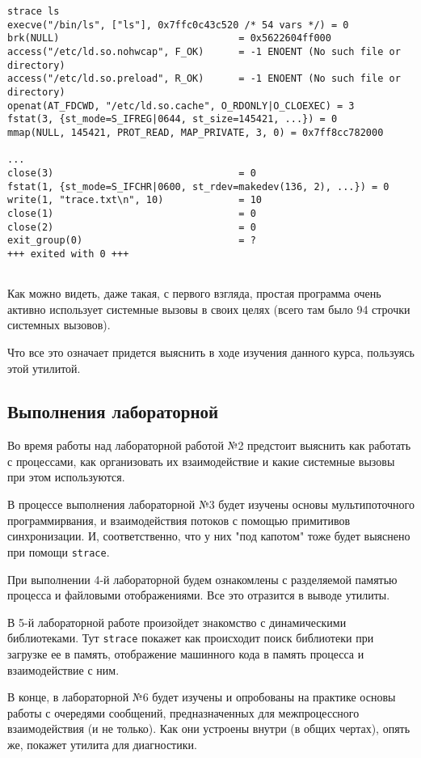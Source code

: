 \documentclass[12pt]{article}
\begin{document}
\begin{lstlisting}[basicstyle=\scriptsize]
strace ls
execve("/bin/ls", ["ls"], 0x7ffc0c43c520 /* 54 vars */) = 0
brk(NULL)                               = 0x5622604ff000
access("/etc/ld.so.nohwcap", F_OK)      = -1 ENOENT (No such file or directory)
access("/etc/ld.so.preload", R_OK)      = -1 ENOENT (No such file or directory)
openat(AT_FDCWD, "/etc/ld.so.cache", O_RDONLY|O_CLOEXEC) = 3
fstat(3, {st_mode=S_IFREG|0644, st_size=145421, ...}) = 0
mmap(NULL, 145421, PROT_READ, MAP_PRIVATE, 3, 0) = 0x7ff8cc782000

...
close(3)                                = 0
fstat(1, {st_mode=S_IFCHR|0600, st_rdev=makedev(136, 2), ...}) = 0
write(1, "trace.txt\n", 10)             = 10
close(1)                                = 0
close(2)                                = 0
exit_group(0)                           = ?
+++ exited with 0 +++


\end{lstlisting}

Как можно видеть, даже такая, с первого взгляда, простая программа очень активно использует системные вызовы в своих целях (всего там было 94 строчки системных вызовов).

Что все это означает придется выяснить в ходе изучения данного курса, пользуясь этой утилитой.

\subsection*{Выполнения лабораторной}

Во время работы над лабораторной работой №2 предстоит выяснить как работать с процессами, как организовать их взаимодействие и какие системные вызовы при этом используются.

В процессе выполнения лабораторной №3 будет изучены основы мультипоточного программирвания, и взаимодействия потоков с помощью примитивов синхронизации.
И, соответственно, что у них "под капотом" тоже будет выяснено при помощи \verb|strace|.

При выполнении 4-й лабораторной будем ознакомлены с разделяемой памятью процесса и файловыми отображениями. Все это отразится в выводе утилиты.

В 5-й лабораторной работе произойдет знакомство с динамическими библиотеками. Тут \verb|strace| покажет как происходит поиск библиотеки при загрузке ее в память, отображение машинного кода в память процесса и взаимодействие с ним.

В конце, в лабораторной №6 будет изучены и опробованы на практике основы работы с очередями сообщений, предназначенных для межпроцессного взаимодействия (и не только). Как они устроены внутри (в общих чертах), опять же, покажет утилита для диагностики.
\end{document}
